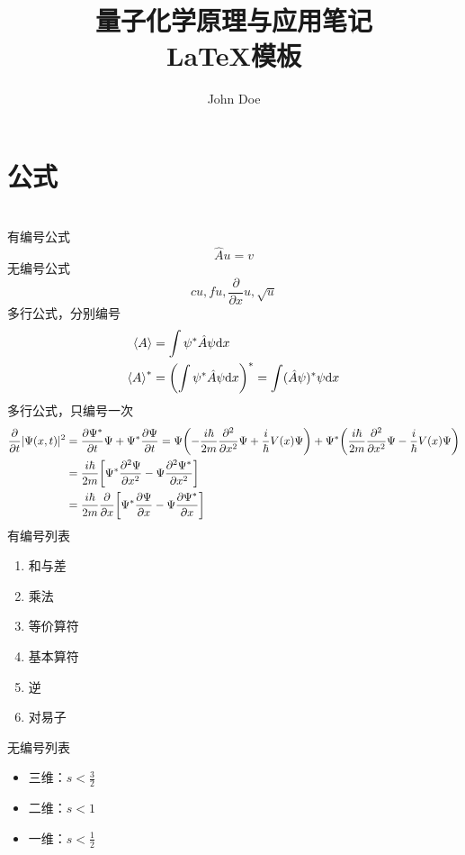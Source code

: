 \documentclass[11pt,a4paper,onecolumn]{article}
\title{%
	\heiti \huge \vspace{-50pt} 量子化学原理与应用笔记 \\ \LaTeX 模板}
\author{John Doe}
\begin{document}


\maketitle
\vspace{-10pt}



\section{公式}

~\\
有编号公式
\begin{equation}
  \hat A u = v
\end{equation}
无编号公式
\begin{equation*}
  c u, f u, \frac{\partial}{\partial x} u, \sqrt{u}
\end{equation*}
多行公式，分别编号
\begin{align}
\ev{A} &= \int \psi^* \hat A \psi \dd x \\
\ev{A}^* &= \qty(\int \psi^* \hat A \psi \dd x )^* = \int (\hat A \psi)^* \psi \dd x
\end{align}
多行公式，只编号一次
\begin{align}
\pdv{t} |\Psi(x,t)|^2  &= \pdv{\Psi^*}{t}\Psi + \Psi^*\pdv{\Psi}{t}  
= \Psi \qty(-\dfrac{i\hbar}{2m} \pdv[2]{x} \Psi + \dfrac{i}{\hbar} V(x) \Psi) + \Psi^* \qty(\dfrac{i\hbar}{2m} \pdv[2]{x} \Psi - \dfrac{i}{\hbar} V(x) \Psi) \notag\\
&= \dfrac{i\hbar}{2m} \qty[\Psi^*\pdv[2]{\Psi}{x} - \Psi\pdv[2]{\Psi^*}{x}] \notag\\
&= \dfrac{i\hbar}{2m} \pdv{x} \qty[\Psi^*\pdv{\Psi}{x} - \Psi\pdv{\Psi^*}{x}]
\end{align}
有编号列表
\begin{enumerate}[nosep]
	\item 和与差
	\item 乘法
	\item 等价算符
	\item 基本算符
	\item 逆
	\item 对易子
\end{enumerate}
无编号列表
	\begin{itemize}[nosep]
	\item 三维：$ s < \frac{3}{2} $
	\item  二维：$ s < 1 $
	\item  一维：$ s < \frac{1}{2} $
\end{itemize}
\end{document}
